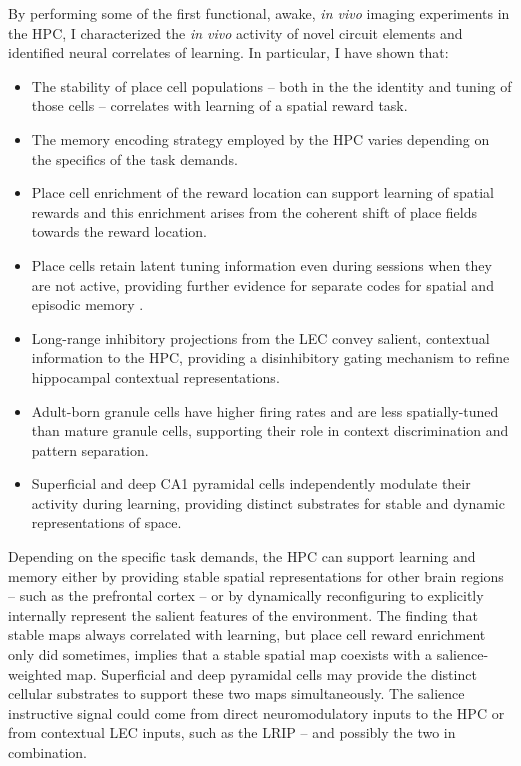 By performing some of the first functional, awake, \emph{in vivo} imaging experiments in the \ac{HPC}, I characterized the \emph{in vivo} activity of novel circuit elements and identified neural correlates of learning.
In particular, I have shown that:
\begin{itemize}
	\item The stability of place cell populations -- both in the the identity and tuning of those cells -- correlates with learning of a spatial reward task.
	\item The memory encoding strategy employed by the \ac{HPC} varies depending on the specifics of the task demands.
	\item Place cell enrichment of the reward location can support learning of spatial rewards and this enrichment arises from the coherent shift of place fields towards the reward location.
	\item Place cells retain latent tuning information even during sessions when they are not active, providing further evidence for separate codes for spatial and episodic memory \citep{Leutgeb2005a}.
	\item Long-range inhibitory projections from the \ac{LEC} convey salient, contextual information to the \ac{HPC}, providing a disinhibitory gating mechanism to refine hippocampal contextual representations.
	\item Adult-born granule cells have higher firing rates and are less spatially-tuned than mature granule cells, supporting their role in context discrimination and pattern separation.
	\item Superficial and deep CA1 pyramidal cells independently modulate their activity during learning, providing distinct substrates for stable and dynamic representations of space.
\end{itemize}

Depending on the specific task demands, the \ac{HPC} can support learning and memory either by providing stable spatial representations for other brain regions -- such as the prefrontal cortex -- or by dynamically reconfiguring to explicitly internally represent the salient features of the environment. 
The finding that stable maps always correlated with learning, but place cell reward enrichment only did sometimes, implies that a stable spatial map coexists with a salience-weighted map. Superficial and deep pyramidal cells may provide the distinct cellular substrates to support these two maps simultaneously. The salience instructive signal could come from direct neuromodulatory inputs to the \ac{HPC} or from contextual \ac{LEC} inputs, such as the \ac{LRIP} -- and possibly the two in combination.


